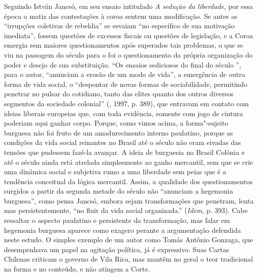 Seguindo István Jancsó, em seu ensaio intitulado \emph{A sedução da
liberdade,} por essa época o matiz das contestações à coroa sentem uma
modificação. Se antes as ``irrupções coletivas de rebeldia'' se esvaiam
``no específico de sua motivação imediata'', fossem questões de excessos
fiscais ou questões de legislação, e a Coroa emergia sem maiores
questionamentos após superados tais problemas, o que se viu na passagem
do século  para o  foi o questionamento da própria organização
do poder e desejo de sua substituição. ``Os ensaios sediciosos do final
do século '', para o autor, ``anunciam a erosão de um modo de
vida'', a emergência de outra forma de vida social, o ``despontar de
novas formas de sociabilidade, permitindo penetrar no pulsar do
cotidiano, tanto das elites quanto dos outros diversos segmentos da
sociedade colonial'' (, 1997, p. 389), que entravam em contato com
ideias liberais europeias que, com toda evidência, somente com jogo de
cintura poderiam aqui ganhar corpo. Porque, como vimos acima, a
forma"-sujeito burguesa não foi fruto de um amadurecimento interno
paulatino, porque as condições da vida social reinantes no Brasil até o
século  não eram eivadas das tensões que pudessem fazê-la avançar. A
ideia de burguesia no Brasil Colônia e até o século  ainda está
atrelada simplesmente ao ganho mercantil, sem que se crie uma dinâmica
social e subjetiva rumo a uma liberdade sem peias que é a tendência
conceitual da lógica mercantil. Assim, a qualidade dos questionamentos
surgidos a partir da segunda metade do século  não ``anunciam a
hegemonia burguesa'', como pensa Jancsó, embora sejam transformações que
penetram, lenta mas persistentemente, ``no fluir da vida social
organizada.'' (\emph{Idem}, p. 393). Cabe ressaltar o aspecto paulatino
e persistente da transformação, mas falar em hegemonia burguesa aparece
como exagero perante a argumentação defendida neste estudo. O simples
exemplo de um autor como Tomás Antônio Gonzaga, que desempenhava um
papel na agitação política, já é expressivo. Suas Cartas Chilenas
criticam o governo de Vila Rica, mas mantêm no geral o teor tradicional
na forma e no conteúdo, e não atingem a Corte.

